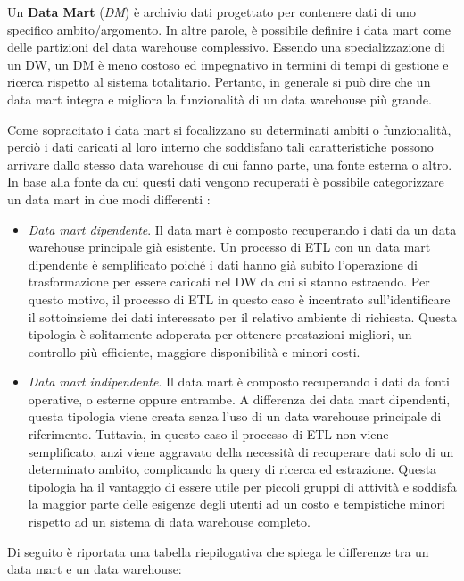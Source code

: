 Un \textbf{Data Mart} (\textit{DM}) è archivio dati progettato per contenere dati di uno specifico ambito/argomento. In altre parole, è possibile definire i data mart come delle partizioni del data warehouse complessivo. Essendo una specializzazione di un DW, un DM è meno costoso ed impegnativo in termini di tempi di gestione e ricerca rispetto al sistema totalitario. Pertanto, in generale si può dire che un data mart integra e migliora la funzionalità di un data warehouse più grande.

Come sopracitato i data mart si focalizzano su determinati ambiti o funzionalità, perciò i dati caricati al loro interno che soddisfano tali caratteristiche possono arrivare dallo stesso data warehouse di cui fanno parte, una fonte esterna o altro. In base alla fonte da cui questi dati vengono recuperati è possibile categorizzare un data mart in due modi differenti \cite{itl_data_warehousing_and_mining}:

\begin{itemize}
    \item \textit{Data mart dipendente}. Il data mart è composto recuperando i dati da un data warehouse principale già esistente. Un processo di ETL con un data mart dipendente è semplificato poiché i dati hanno già subito l'operazione di trasformazione per essere caricati nel DW da cui si stanno estraendo. Per questo motivo, il processo di ETL in questo caso è incentrato sull'identificare il sottoinsieme dei dati interessato per il relativo ambiente di richiesta. Questa tipologia è solitamente adoperata per ottenere prestazioni migliori, un controllo più efficiente, maggiore disponibilità e minori costi.
    \item \textit{Data mart indipendente}. Il data mart è composto recuperando i dati da fonti operative, o esterne oppure entrambe. A differenza dei data mart dipendenti, questa tipologia viene creata senza l'uso di un data warehouse principale di riferimento. Tuttavia, in questo caso il processo di ETL non viene semplificato, anzi viene aggravato della necessità di recuperare dati solo di un determinato ambito, complicando la query di ricerca ed estrazione. Questa tipologia ha il vantaggio di essere utile per piccoli gruppi di attività e soddisfa la maggior parte delle esigenze degli utenti ad un costo e tempistiche minori rispetto ad un sistema di data warehouse completo.
\end{itemize}

Di seguito è riportata una tabella riepilogativa che spiega le differenze tra un data mart e un data warehouse:\cite{streamsets_data_mart_vs_data_warehouse}

